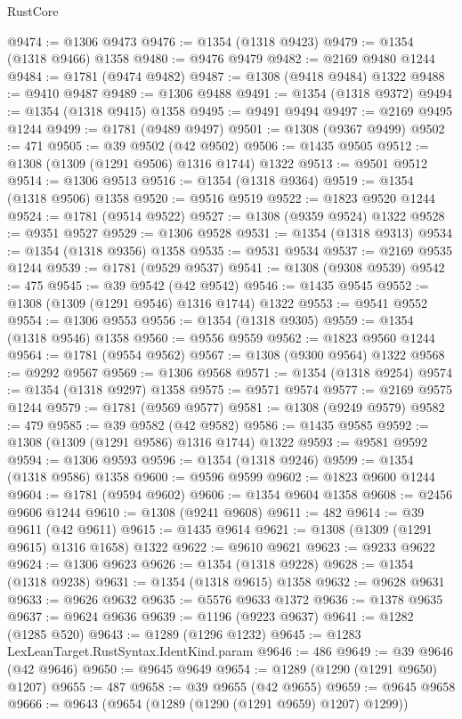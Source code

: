 \begin{lexlean}{RustCore}
\begin{coremodule}
@9474 := @1306 @9473
@9476 := @1354 (@1318 @9423)
@9479 := @1354 (@1318 @9466) @1358
@9480 := @9476 @9479
@9482 := @2169 @9480 @1244
@9484 := @1781 (@9474 @9482)
@9487 := @1308 (@9418 @9484) @1322
@9488 := @9410 @9487
@9489 := @1306 @9488
@9491 := @1354 (@1318 @9372)
@9494 := @1354 (@1318 @9415) @1358
@9495 := @9491 @9494
@9497 := @2169 @9495 @1244
@9499 := @1781 (@9489 @9497)
@9501 := @1308 (@9367 @9499)
@9502 := 471
@9505 := @39 @9502 (@42 @9502)
@9506 := @1435 @9505
@9512 := @1308 (@1309 (@1291 @9506) @1316 @1744) @1322
@9513 := @9501 @9512
@9514 := @1306 @9513
@9516 := @1354 (@1318 @9364)
@9519 := @1354 (@1318 @9506) @1358
@9520 := @9516 @9519
@9522 := @1823 @9520 @1244
@9524 := @1781 (@9514 @9522)
@9527 := @1308 (@9359 @9524) @1322
@9528 := @9351 @9527
@9529 := @1306 @9528
@9531 := @1354 (@1318 @9313)
@9534 := @1354 (@1318 @9356) @1358
@9535 := @9531 @9534
@9537 := @2169 @9535 @1244
@9539 := @1781 (@9529 @9537)
@9541 := @1308 (@9308 @9539)
@9542 := 475
@9545 := @39 @9542 (@42 @9542)
@9546 := @1435 @9545
@9552 := @1308 (@1309 (@1291 @9546) @1316 @1744) @1322
@9553 := @9541 @9552
@9554 := @1306 @9553
@9556 := @1354 (@1318 @9305)
@9559 := @1354 (@1318 @9546) @1358
@9560 := @9556 @9559
@9562 := @1823 @9560 @1244
@9564 := @1781 (@9554 @9562)
@9567 := @1308 (@9300 @9564) @1322
@9568 := @9292 @9567
@9569 := @1306 @9568
@9571 := @1354 (@1318 @9254)
@9574 := @1354 (@1318 @9297) @1358
@9575 := @9571 @9574
@9577 := @2169 @9575 @1244
@9579 := @1781 (@9569 @9577)
@9581 := @1308 (@9249 @9579)
@9582 := 479
@9585 := @39 @9582 (@42 @9582)
@9586 := @1435 @9585
@9592 := @1308 (@1309 (@1291 @9586) @1316 @1744) @1322
@9593 := @9581 @9592
@9594 := @1306 @9593
@9596 := @1354 (@1318 @9246)
@9599 := @1354 (@1318 @9586) @1358
@9600 := @9596 @9599
@9602 := @1823 @9600 @1244
@9604 := @1781 (@9594 @9602)
@9606 := @1354 @9604 @1358
@9608 := @2456 @9606 @1244
@9610 := @1308 (@9241 @9608)
@9611 := 482
@9614 := @39 @9611 (@42 @9611)
@9615 := @1435 @9614
@9621 := @1308 (@1309 (@1291 @9615) @1316 @1658) @1322
@9622 := @9610 @9621
@9623 := @9233 @9622
@9624 := @1306 @9623
@9626 := @1354 (@1318 @9228)
@9628 := @1354 (@1318 @9238)
@9631 := @1354 (@1318 @9615) @1358
@9632 := @9628 @9631
@9633 := @9626 @9632
@9635 := @5576 @9633 @1372
@9636 := @1378 @9635
@9637 := @9624 @9636
@9639 := @1196 (@9223 @9637)
@9641 := @1282 (@1285 @520)
@9643 := @1289 (@1296 @1232)
@9645 := @1283 LexLeanTarget.RustSyntax.IdentKind.param
@9646 := 486
@9649 := @39 @9646 (@42 @9646)
@9650 := @9645 @9649
@9654 := @1289 (@1290 (@1291 @9650) @1207)
@9655 := 487
@9658 := @39 @9655 (@42 @9655)
@9659 := @9645 @9658
@9666 := @9643 (@9654 (@1289 (@1290 (@1291 @9659) @1207) @1299))

\end{coremodule}
\end{lexlean}
